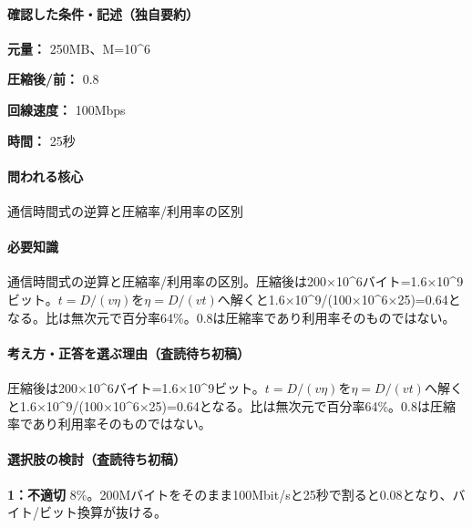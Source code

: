 \paragraph{確認した条件・記述（独自要約）}\mbox{}\par

\noindent\textbf{元量：} 250MB、M=\allowbreak{}10\textasciicircum{}6\par

\noindent\textbf{圧縮後/前：} 0.8\par

\noindent\textbf{回線速度：} 100Mbps\par

\noindent\textbf{時間：} 25秒\par

\paragraph{問われる核心} 通信時間式の逆算と圧縮率/利用率の区別

\paragraph{必要知識} 通信時間式の逆算と圧縮率/利用率の区別。圧縮後は200×10\textasciicircum{}6バイト=1.6×10\textasciicircum{}9ビット。\(t=D/(v\eta)\)を\(\eta=D/(vt)\)へ解くと1.6×10\textasciicircum{}9/(100×10\textasciicircum{}6×25)=\allowbreak{}0.64となる。比は無次元で百分率64\%。0.8は圧縮率であり利用率そのものではない。

\paragraph{考え方・正答を選ぶ理由（査読待ち初稿）} 圧縮後は200×10\textasciicircum{}6バイト=1.6×10\textasciicircum{}9ビット。\(t=D/(v\eta)\)を\(\eta=D/(vt)\)へ解くと1.6×10\textasciicircum{}9/(100×10\textasciicircum{}6×25)=\allowbreak{}0.64となる。比は無次元で百分率64\%。0.8は圧縮率であり利用率そのものではない。

\paragraph{選択肢の検討（査読待ち初稿）}\mbox{}\par

\noindent\textbf{1：不適切} 8\%。200Mバイトをそのまま100Mbit/sと25秒で割ると0.08となり、バイト/ビット換算が抜ける。\par

